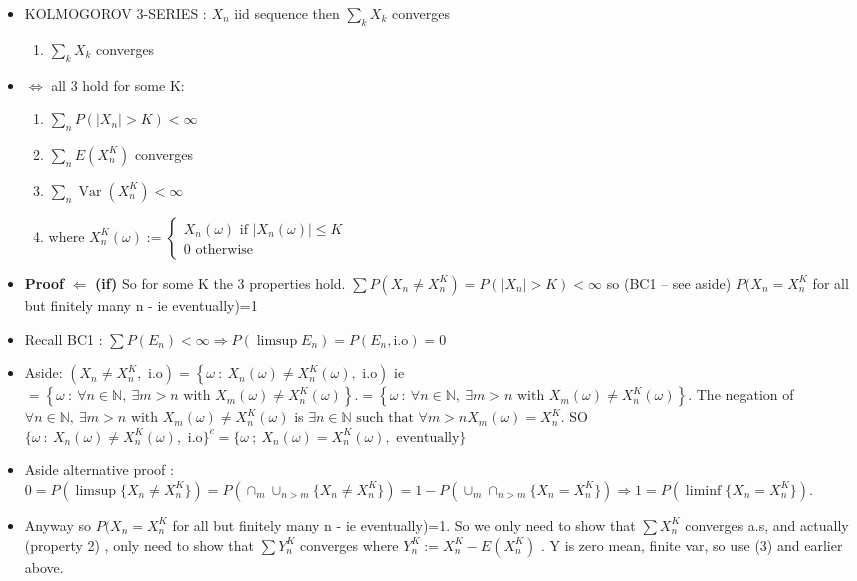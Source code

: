 \documentclass[10pt,landscape,a4paper]{article}
\newcommand{\Var}{ \operatorname{Var} }
\begin{document}
\begin{multicols*}{3}
\begin{spacing}{0.5}
\begin{itemize}
\item \colorbox{green!10}{KOLMOGOROV 3-SERIES} : $X_n$ iid sequence then $\sum_{k}X_k$ converges 
\begin{enumerate}
\item $\sum_{k}X_k$ converges
\end{enumerate}
\item $\Leftrightarrow$ all 3 hold for some K:
\begin{enumerate}
\item $\sum_n P(|X_n|>K) < \infty$
\item $\sum_n  E(X_n^K)$ converges
\item $\sum_n \Var(X_n^K) < \infty$
\item where $X_n^K(\omega) := \begin{cases} X_n(\omega) \text{ if } |X_n(\omega)| \le K \\ 0 \text{ otherwise} \end{cases} $
\end{enumerate}
\item \textbf{Proof} $\Leftarrow$\textbf{ (if)} So for some K the 3 properties hold. $\sum P(X_n \neq X_n^K) = P(|X_n|>K) < \infty$ so (BC1 -- see aside) $P(X_n = X_n^K$ for all but finitely many n - ie eventually)=1 

\item \colorbox{blue!10}{Recall BC1} : \colorbox{blue!10}{$ \sum P(E_n) < \infty \Rightarrow P(\limsup E_n) = P(E_n,\text{i.o})= 0 $} 

\item Aside: $(X_n\neq X_n^K,\text{ i.o})=\left\{\omega\::\: X_n(\omega)\neq X_n^K(\omega),\text{ i.o}\right) $ ie $=\left\{\omega\::\: \forall n\in\mathbb{N},\:\exists m>n\text{ with } X_m(\omega)\neq X_n^K(\omega)\right\}.=\left\{\omega\::\: \forall n\in\mathbb{N},\:\exists m>n\text{ with } X_m(\omega)\neq X_n^K(\omega)\right\}.$ The negation of $\forall n\in\mathbb{N},\:\exists m>n\text{ with } X_m(\omega)\neq X_n^K(\omega)$ is $\exists n\in\mathbb{N}\text{ such that }\forall m>n X_m(\omega)=X_n^K$. SO $\{\omega\::\: X_n(\omega)\neq X_n^K(\omega),\text{ i.o}\}^c=\{\omega\:;\:X_n(\omega)= X_n^K(\omega),\text{ eventually}\}$

\item Aside alternative proof :  $0 = P(\limsup \{X_n \neq X_n^K\}) = P(\cap_m \cup_{n > m} \{X_n \neq X_n^K\}) = 1 - P(\cup_m \cap_{n > m} \{X_n = X_n^K\}) \Rightarrow 1 = P(\liminf \{X_n = X_n^K\})$.

\item Anyway so $P(X_n = X_n^K$ for all but finitely many n - ie eventually)=1. So we only need to show that $\sum X_n^K$ converges a.s, and actually (property 2) , only need to show that $\sum Y_n^K$ converges where $Y_n^K := X_n^K - E(X_n^K)$ . Y is zero mean, finite var, so use (3) and earlier above.


\end{itemize}
\end{spacing}
\end{multicols*}
\end{document}
